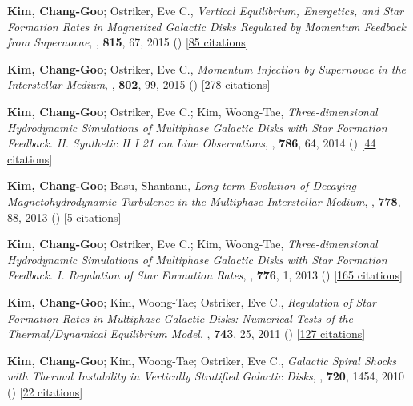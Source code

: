 \item[{37.}]\textbf{Kim, Chang-Goo}; Ostriker, Eve C., \textit{Vertical Equilibrium, Energetics, and Star Formation Rates in Magnetized Galactic Disks Regulated by Momentum Feedback from Supernovae}, , \textbf{815}, 67, 2015 () [\href{http://adsabs.harvard.edu/abs/2015ApJ...815...67K}{85 citations}]

\item[{36.}]\textbf{Kim, Chang-Goo}; Ostriker, Eve C., \textit{Momentum Injection by Supernovae in the Interstellar Medium}, , \textbf{802}, 99, 2015 () [\href{http://adsabs.harvard.edu/abs/2015ApJ...802...99K}{278 citations}]

\item[{35.}]\textbf{Kim, Chang-Goo}; Ostriker, Eve C.; Kim, Woong-Tae, \textit{Three-dimensional Hydrodynamic Simulations of Multiphase Galactic Disks with Star Formation Feedback. II. Synthetic H I 21 cm Line Observations}, , \textbf{786}, 64, 2014 () [\href{http://adsabs.harvard.edu/abs/2014ApJ...786...64K}{44 citations}]

\item[{34.}]\textbf{Kim, Chang-Goo}; Basu, Shantanu, \textit{Long-term Evolution of Decaying Magnetohydrodynamic Turbulence in the Multiphase Interstellar Medium}, , \textbf{778}, 88, 2013 () [\href{http://adsabs.harvard.edu/abs/2013ApJ...778...88K}{5 citations}]

\item[{33.}]\textbf{Kim, Chang-Goo}; Ostriker, Eve C.; Kim, Woong-Tae, \textit{Three-dimensional Hydrodynamic Simulations of Multiphase Galactic Disks with Star Formation Feedback. I. Regulation of Star Formation Rates}, , \textbf{776}, 1, 2013 () [\href{http://adsabs.harvard.edu/abs/2013ApJ...776....1K}{165 citations}]

\item[{32.}]\textbf{Kim, Chang-Goo}; Kim, Woong-Tae; Ostriker, Eve C., \textit{Regulation of Star Formation Rates in Multiphase Galactic Disks: Numerical Tests of the Thermal/Dynamical Equilibrium Model}, , \textbf{743}, 25, 2011 () [\href{http://adsabs.harvard.edu/abs/2011ApJ...743...25K}{127 citations}]

\item[{31.}]\textbf{Kim, Chang-Goo}; Kim, Woong-Tae; Ostriker, Eve C., \textit{Galactic Spiral Shocks with Thermal Instability in Vertically Stratified Galactic Disks}, , \textbf{720}, 1454, 2010 () [\href{http://adsabs.harvard.edu/abs/2010ApJ...720.1454K}{22 citations}]

